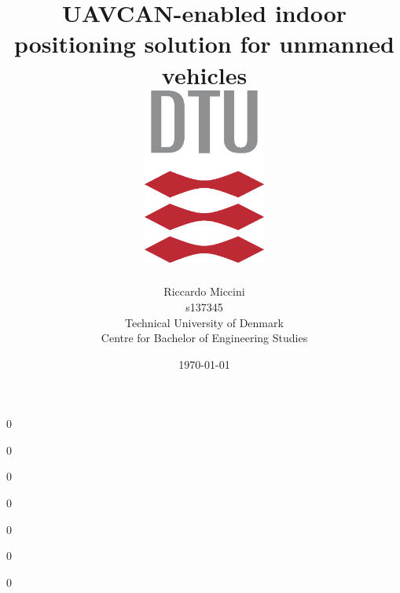 \documentclass[a4paper, final]{report}
\title{UAVCAN-enabled indoor positioning solution for unmanned vehicles \\ \vspace{2cm} \includegraphics[width=4cm]{gfx/DTULogo.pdf} \vspace{2cm}}
\author{Riccardo Miccini  \\
	s137345
	\smallskip \\
	Technical University of Denmark \\
	Centre for Bachelor of Engineering Studies
	}
\date{\today}
\begin{document}
\begin{titlepage}
\maketitle
\thispagestyle{empty}
\end{titlepage}

\newpage
{}
\setcounter{page}{0}

\tableofcontents
\listoffigures
\listoftables


\newpage
{}

{0}

{0}

{0}

{0}

{0}

{0}

{0}
\end{document}

